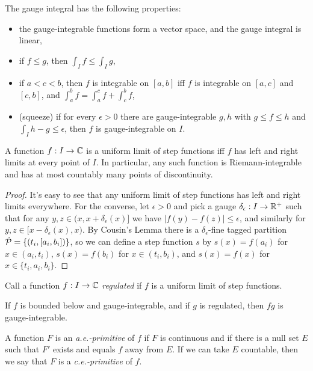 \begin{prop} The gauge integral has the following properties:
\begin{itemize}
\item the gauge-integrable functions form a vector space, and the gauge integral is linear,
\item if $f \le g$, then $\int_I f \le \int_I g$,
\item if $a < c < b$, then $f$ is integrable on $[a,b]$ iff $f$ is integrable on $[a,c]$ and $[c,b]$, and $\int_a^b f = \int_a^c f + \int_c^b f$,
\item (squeeze) if for every $\epsilon > 0$ there are gauge-integrable $g,h$ with $g \le f \le h$ and $\int_I h-g \le \epsilon$, then $f$ is gauge-integrable on $I$.
\end{itemize}
\end{prop}

\begin{prop} A function $f : I \rightarrow \mathbb{C}$ is a uniform limit of step functions iff $f$ has left and right limits at every point of $I$. In particular, any such function is Riemann-integrable and has at most countably many points of discontinuity.
\end{prop}
\begin{proof} It's easy to see that any uniform limit of step functions has left and right limits everywhere. For the converse, let $\epsilon > 0$ and pick a gauge $\delta_\epsilon : I \rightarrow \mathbb{R}^+$ such that for any $y, z \in (x, x + \delta_\epsilon(x)]$ we have $|f(y) - f(z)| \le \epsilon$, and similarly for $y,z \in [x - \delta_\epsilon(x), x)$. By Cousin's Lemma there is a $\delta_\epsilon$-fine tagged partition $\dot{\mathcal{P}} = \{(t_i,[a_i,b_i])\}$, so we can define a step function $s$ by $s(x) = f(a_i)$ for $x \in (a_i,t_i)$, $s(x) = f(b_i)$ for $x \in (t_i,b_i)$, and $s(x) = f(x)$ for $x \in \{t_i,a_i,b_i\}$.
\end{proof}

\begin{defn} Call a function $f : I \rightarrow \mathbb{C}$ \emph{regulated} if $f$ is a uniform limit of step functions.
\end{defn}

\begin{prop} If $f$ is bounded below and gauge-integrable, and if $g$ is regulated, then $fg$ is gauge-integrable.
\end{prop}

\begin{defn} A function $F$ is an \emph{a.e.-primitive} of $f$ if $F$ is continuous and if there is a null set $E$ such that $F'$ exists and equals $f$ away from $E$. If we can take $E$ countable, then we say that $F$ is a \emph{c.e.-primitive} of $f$.
\end{defn}

